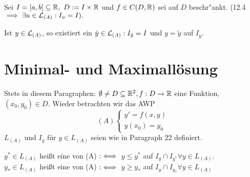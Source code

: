\documentclass[a4paper,twoside,DIV15,BCOR12mm]{scrbook}
\begin{document}
\begin{satz}
Sei $I=[a,b] \subseteq \MdR,\ D:=I\times\MdR$ und $f \in C(D,\mathbb{R})$ sei auf $D$ beschr"ankt. (12.4 $\implies \exists u\in\mathcal{L}_{(A)}: I_u=I).$

Ist $y\in\mathcal{L}_{(A)}$, so existiert ein $\tilde{y}\in\mathcal{L}_{(A)}: I_{\tilde{y}} = I$ und $y=\tilde{y}$ auf $I_y$.
\end{satz}
\chapter{Minimal- und Maximallösung}
Stets in diesem Paragraphen: $\emptyset \ne D \subseteq \mathbb{R}^2, f:D\to\mathbb{R}$ eine Funktion, $(x_0, y_0) \in D $. Wieder betrachten wir das 
AWP  \[(A) \begin{cases} y' = f(x,y)\\ y(x_0) = y_0 \end{cases}\]
$L_{(A)} $ und $I_y$ für $ y \in L_{(A)}$ seien wie in Paragraph 22 definiert.
 
\begin{definition}
 $y^* \in L_{(A)} $ heißt eine  von (A) $:\iff$ $y \leq y^*$ auf $I_y \cap I_{y^*} \forall y \in L_{(A)}$.\\
 $y_* \in L_{(A)} $ heißt eine  von (A) $:\iff$ $y \geq y_*$ auf $I_y \cap I_{y_*} \forall y \in L_{(A)}$
\end{definition}
\end{document}
